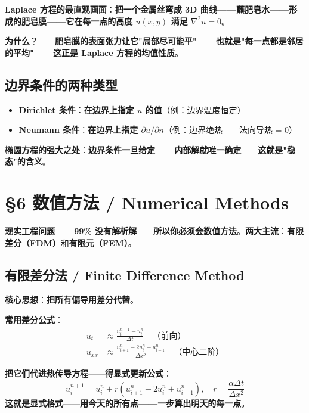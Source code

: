 \textbf{Laplace 方程的最直观画面}：\textbf{把一个金属丝弯成 3D 曲线——蘸肥皂水——形成的肥皂膜——\textbf{它在每一点的高度 $u(x, y)$ 满足 $\nabla^2 u = 0$}}。

\textbf{为什么}？——\textbf{肥皂膜的表面张力让它"局部尽可能平"——也就是}\textbf{"每一点都是邻居的平均"——这正是 Laplace 方程的均值性质}。

\subsection{边界条件的两种类型}

\begin{itemize}
\item \textbf{Dirichlet 条件}：\textbf{在边界上指定 $u$ 的值}（例：边界温度恒定）
\item \textbf{Neumann 条件}：\textbf{在边界上指定 $\partial u / \partial n$}（例：边界绝热——法向导热 = 0）
\end{itemize}

\textbf{椭圆方程的强大之处}：\textbf{边界条件一旦给定——内部解就唯一确定}——\textbf{这就是"稳态"的含义}。

\section{§6 数值方法 / Numerical Methods}

\textbf{现实工程问题——99\% 没有解析解}——\textbf{所以你必须会数值方法}。\textbf{两大主流}：\textbf{有限差分（FDM）}和\textbf{有限元（FEM）}。

\subsection{有限差分法 / Finite Difference Method}

\textbf{核心思想}：\textbf{把所有偏导用差分代替}。

\textbf{常用差分公式}：
\begin{align}
u_t &\approx \frac{u^{n+1}_i - u^n_i}{\Delta t} \quad \text{（前向）}\\
u_{xx} &\approx \frac{u^n_{i+1} - 2 u^n_i + u^n_{i-1}}{\Delta x^2} \quad \text{（中心二阶）}
\end{align}

\textbf{把它们代进热传导方程}——\textbf{得显式更新公式}：
\begin{equation}
u^{n+1}_i = u^n_i + r (u^n_{i+1} - 2 u^n_i + u^n_{i-1}), \quad r = \frac{\alpha \Delta t}{\Delta x^2}
\end{equation}
\textbf{这就是}\textbf{显式格式}——\textbf{用今天的所有点——一步算出明天的每一点}。

